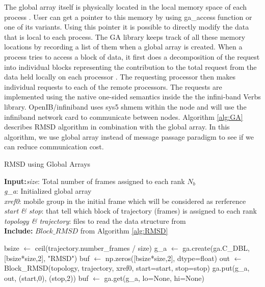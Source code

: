The global array itself is physically located in the local memory space of each process \cite{GA}. 
User can get a pointer to this memory by using ga\_access function or one of its variants.
Using this pointer it is possible to directly modify the data that is local to each process. 
The GA library keeps track of all these memory locations by recording a list of them when a global array is created. 
When a process tries to access a block of data, it first does a decomposition of the request into individual blocks representing the contribution to the total request from the data held locally on each processor \cite{PNNL:2017}. 
The requesting processor then makes individual requests to each of the remote processors. 
The requests are implemented using the native one-sided semantics inside the the infini-band Verbs library. 
OpenIB/infiniband uses sys5 shmem within the node and will use the infiniband network card to communicate between nodes.
Algorithm \ref{alg:GA} describes RMSD algorithm in combination with the global array.
In this algorithm, we use global array instead of message passage paradigm to see if we can reduce communication cost. 

\begin{algorithm}[ht!]
	\scriptsize
	\caption{RMSD using Global Arrays}
	\label{alg:GA}
	\hspace*{\algorithmicindent} \textbf{Input:}\emph{size}: Total number of frames assigned to each rank $N_{b}$\\
	\hspace*{\algorithmicindent} \emph{g\_a}: Initialized global array \\
	\hspace*{\algorithmicindent} \emph{xref0}: mobile group in the initial frame which will be considered as rerference \\
	\hspace*{\algorithmicindent} \emph{start \& stop}: that tell which block of trajectory (frames) is assigned to each rank \\
	\hspace*{\algorithmicindent} \emph{topology \& trajectory}: files to read the data structure from \\
	\hspace*{\algorithmicindent}\textbf{Include:} $Block\_RMSD$ from Algorithm \ref{alg:RMSD}
	\begin{algorithmic}[1]
		
		\State bsize $\leftarrow$ ceil(trajectory.number\_frames / size)
		\State g\_a $\leftarrow$ ga.create(ga.C\_DBL, [bsize*size,2], "RMSD")
		\State buf $\leftarrow$ np.zeros([bsize*size,2], dtype=float)
		\State out $\leftarrow$ Block\_RMSD(topology, trajectory, xref0, start=start, stop=stop)
		\State ga.put(g\_a, out, (start,0), (stop,2))
		\State buf $\leftarrow$ ga.get(g\_a, lo=None, hi=None)
		\EndIf
	\end{algorithmic}
\end{algorithm}


